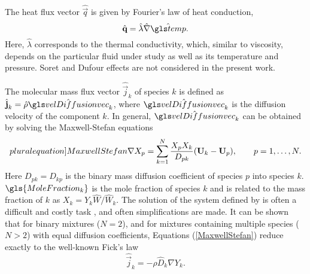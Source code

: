 The heat flux vector $\hat{\vec{q}}$ is given by Fourier's law of heat conduction,
\begin{equation}
	\hat{\vec{q}} = \hat \lambda \hat{\nabla} \glsHat{temp}.
	\label{eq:fourierLaw}
\end{equation}
Here, $\hat \lambda$ corresponds to the thermal conductivity, which, similar to viscosity, depends on the particular fluid under study as well as its temperature and pressure. Soret and Dufour effects are not considered in the present work.

The molecular mass flux vector $\hat{\vec{j}}_k$ of species $k$ is defined as $ \hat{\vec{j}}_k = \hat \rho \glsHat{velDiffusionvec}_k$, where $\glsHat{velDiffusionvec}_k$ is the diffusion velocity of the component $k$. In general, $\glsHat{velDiffusionvec}_k$ can be obtained by solving the Maxwell-Stefan equations
\begin{equation}\label[pluralequation]{MaxwellStefan}
	\nabla X_p = \sum_{k=1}^{N}\frac{X_p X_k}{D_{pk}}(\vec{U}_k-\vec{U}_p), \qquad p = 1,\dots,N. 
\end{equation}
Here $D_{pk} = D_{kp}$ is the binary mass diffusion coefficient of species $p$ into species $k$. $\gls{MoleFraction_k}$ is the mole fraction of species $k$ and is related to the mass fraction of $k$ as $ X_k = Y_k \hat W /\hat W_k$.
The solution of the system defined by  is often a difficult and costly task \parencite{williamsCombustionTheoryFundamental2000,poinsotTheoreticalNumericalCombustion2011}, and often simplifications are made. It can be shown that for binary mixtures ($N = 2$), and for mixtures containing multiple species ($N>2$) with equal diffusion coefficients, Equations (\ref{MaxwellStefan}) reduce exactly to the well-known Fick's law
\begin{equation}
	\hat{\vec{j}}_k = -\rho \hat D_k \nabla Y_k.
\end{equation}\label{eq:FickLaw}
